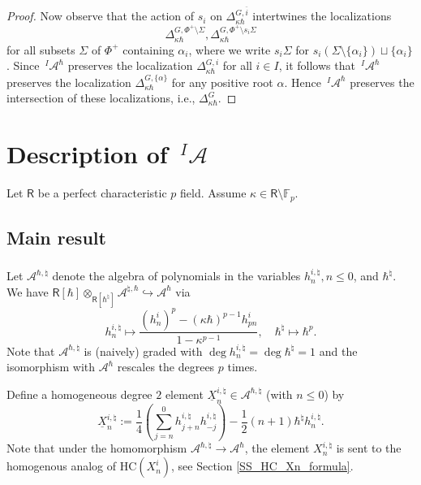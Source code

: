 \documentclass{amsart}
\theoremstyle{definition}
\newcommand{\sss}{\subsubsection{}}
\newcommand{\Ring}{\mathsf{R}}
\newcommand{\HC}{\mathrm{HC}} %
\newcommand{\F}{\mathbb{F}}
\newcommand{\A}{\mathscr{A}}
\numberwithin{equation}{section}
\begin{document}
\begin{proof}
Now observe that the action of $s_i$ on 
$\Delta^{G,\overline{i}}_{\kappa\hbar}$ intertwines the localizations 
$$\Delta^{G,\Phi^+\setminus\Sigma}_{\kappa\hbar}, 
\Delta^{G,\Phi^+\setminus s_i\Sigma}_{\kappa\hbar}$$
for all subsets $\Sigma$ of $\Phi^+$ containing $\alpha_i$, where we write $s_i\Sigma$ for $s_i(\Sigma\setminus \{\alpha_i\})\sqcup \{\alpha_i\}$. Since 
$\,^I \A^\hbar$ preserves the localization 
$\Delta^{G,i}_{\kappa\hbar}$ for all $i\in I$, it follows that $\,^I \A^\hbar$ preserves the localization $\Delta^{G,\{\alpha\}}_{\kappa\hbar}$ for any positive root $\alpha$. Hence $\,^I\!\A^\hbar$ preserves the intersection of these localizations, i.e., $\Delta^G_{\kappa\hbar}$.
\end{proof}

\section{Description of $\,^I\!\A$}\label{S_IA_description}
Let $\Ring$ be a perfect characteristic $p$ field. Assume $\kappa\in \Ring\setminus \F_p$.

\subsection{Main result}

\sss
Let $\A^{\hbar,\natural}$ denote the algebra of polynomials in the variables $h^{i,\natural}_n, n\leqslant 0$, and $\hbar^\natural$.
We have $\Ring[\hbar]\otimes_{\Ring[\hbar^\natural]}\A^{\natural,\hbar}\hookrightarrow \A^\hbar$ via 
$$h^{i,\natural}_n\mapsto \frac{(h^i_n)^p-(\kappa\hbar)^{p-1}h^i_{pn}}{1-\kappa^{p-1}},\quad \hbar^\natural\mapsto \hbar^p.$$ 
Note that $\A^{\hbar,\natural}$ is (naively) graded with 
$\deg h^{i,\natural}_n=\deg \hbar^\natural=1$ and the isomorphism 
with $\A^\hbar$ rescales the degrees $p$ times. 

Define a homogeneous degree $2$ element $\underline{X}^{i,\natural}_n\in \A^{\hbar,\natural}$ (with $n\leqslant 0$) by
\begin{equation}\label{eq:underline_X_in_natural}
\underline{X}^{i,\natural}_n:=\frac{1}{4}\left(\sum_{j=n}^0h^{i,\natural}_{j+n}h^{i,\natural}_{-j}\right)-\frac{1}{2}(n+1)\hbar^\natural h^{i,\natural}_{n}.
\end{equation}
Note that under the homomorphism $\A^{\hbar,\natural}\rightarrow \A^\hbar$, the element $X^{i,\natural}_n$ is sent to the homogenous analog of $\HC(X^i_n)$, see Section \ref{SS_HC_Xn_formula}.
\end{document}
